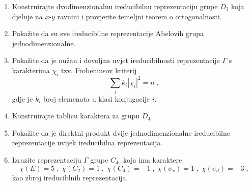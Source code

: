 \begin{enumerate}[label=\arabic{chapter}.\arabic*.]

\item Konstruirajte dvodimenzionalnu ireducibilnu reprezentaciju
    grupe $D_3$ koja djeluje na $x$-$y$ ravnini
i provjerite temeljni teorem o ortogonalnosti.

\item Pokažite da su sve ireducibilne reprezentacije Abelovih grupa jednodimenzionalne.
    \label{zad:1Dabelrep} 

\item Pokažite da je nužan i dovoljan uvjet ireducibilnosti reprezentacije
 $\Gamma$ s karakterima $\chi_i$ tzv. Frobeniusov kriterij
  
\begin{displaymath}
    \sum_i k_i |\chi_i|^2 = n  \;,
\end{displaymath}
gdje je $k_i$ broj elemenata u klasi konjugacije $i$.

\item Konstruirajte tablicu karaktera za grupu $D_4$

\item Pokažite da je direktni produkt dvije jednodimenzionalne
    ireducibilne reprezentacije uvijek ireducibilna reprezentacija.
    \label{zad:1D1D1D}

\item Izrazite reprezentaciju $\Gamma$ grupe $C_{4v}$ koja ima
    karaktere 
\begin{displaymath}
  \chi(E)=5\;,\; \chi(C_2)=1\;,\; \chi(C_4)=-1\;,\;
  \chi(\sigma_v)=1\;,\; \chi(\sigma_d)=-3\;,
\end{displaymath}
kao zbroj ireduciblnih reprezentacija.
\end{enumerate}
